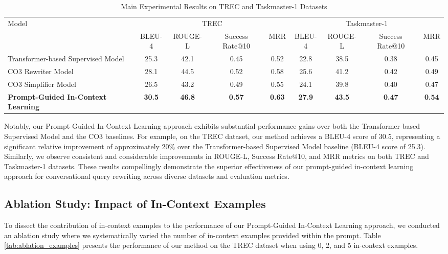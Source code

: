 \begin{table*}[!t]
    \centering
    \caption{Main Experimental Results on TREC and Taskmaster-1 Datasets}
    \label{tab:main_results}
    \begin{tabular}{lcccccccc}
        \toprule
        \multirow{2}{*}{Model} & \multicolumn{4}{c}{TREC} & \multicolumn{4}{c}{Taskmaster-1} \\
        & BLEU-4 & ROUGE-L & Success Rate@10 & MRR & BLEU-4 & ROUGE-L & Success Rate@10 & MRR \\
        \midrule
        Transformer-based Supervised Model & 25.3 & 42.1 & 0.45 & 0.52 & 22.8 & 38.5 & 0.38 & 0.45 \\
        CO3 Rewriter Model & 28.1 & 44.5 & 0.52 & 0.58 & 25.6 & 41.2 & 0.42 & 0.49 \\
        CO3 Simplifier Model & 26.5 & 43.2 & 0.49 & 0.55 & 24.1 & 39.8 & 0.40 & 0.47 \\
        \midrule
        \textbf{Prompt-Guided In-Context Learning} & \textbf{30.5} & \textbf{46.8} & \textbf{0.57} & \textbf{0.63} & \textbf{27.9} & \textbf{43.5} & \textbf{0.47} & \textbf{0.54} \\
        \bottomrule
    \end{tabular}
\end{table*}

Notably, our Prompt-Guided In-Context Learning approach exhibits substantial performance gains over both the Transformer-based Supervised Model and the CO3 baselines.  For example, on the TREC dataset, our method achieves a BLEU-4 score of 30.5, representing a significant relative improvement of approximately 20\% over the Transformer-based Supervised Model baseline (BLEU-4 score of 25.3).  Similarly, we observe consistent and considerable improvements in ROUGE-L, Success Rate@10, and MRR metrics on both TREC and Taskmaster-1 datasets. These results compellingly demonstrate the superior effectiveness of our prompt-guided in-context learning approach for conversational query rewriting across diverse datasets and evaluation metrics.

\subsection{Ablation Study: Impact of In-Context Examples}

To dissect the contribution of in-context examples to the performance of our Prompt-Guided In-Context Learning approach, we conducted an ablation study where we systematically varied the number of in-context examples provided within the prompt.  Table \ref{tab:ablation_examples} presents the performance of our method on the TREC dataset when using 0, 2, and 5 in-context examples.

